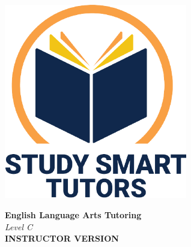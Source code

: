 \documentclass[12pt]{article}
\begin{document}
\newpage




\thispagestyle{empty}

\vspace*{\fill}

\vspace*{3cm}

\begin{center}

    \includegraphics[width=0.6\textwidth]{SST_Color_Logo.png} %
    
    \vspace{2cm} %
    

    
    \Huge \textbf{English Language Arts  Tutoring}\\ [0.3cm]
     \vspace{1.5cm}
    \LARGE \textit{Level C}\\[1cm] 
   

    \Huge \textbf{INSTRUCTOR VERSION}
    
   
    
    \vfill %
    
\end{center}

\newpage








\newpage



\end{document}
